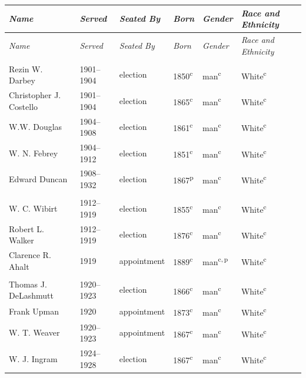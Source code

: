 \begin{longtable}{Q}
\toprule \textit{Name} & \textit{Served} & \textit{Seated By} & \textit{Born} & \textit{Gender} & \textit{Race and Ethnicity} \\ \midrule \endfirsthead
\toprule \textit{Name} & \textit{Served} & \textit{Seated By} & \textit{Born} & \textit{Gender} & \textit{Race and Ethnicity} \\ \midrule \endhead
\bottomrule \endfoot
{} \\*
Rezin W. Darbey & 1901--1904 & election & 1850\textsuperscript{c} & man\textsuperscript{c} & White\textsuperscript{c} \\*
Christopher J. Costello & 1901--1904 & election & 1865\textsuperscript{c} & man\textsuperscript{c} & White\textsuperscript{c} \\
W.W. Douglas & 1904--1908 & election & 1861\textsuperscript{c} & man\textsuperscript{c} & White\textsuperscript{c} \\
W. N. Febrey & 1904--1912 & election & 1851\textsuperscript{c} & man\textsuperscript{c} & White\textsuperscript{c} \\*
Edward Duncan & 1908--1932 & election & 1867\textsuperscript{p} & man\textsuperscript{c} & White\textsuperscript{c} \\
\addlinespace[1.4ex]
 \\*
W. C. Wibirt & 1912--1919 & election & 1855\textsuperscript{c} & man\textsuperscript{c} & White\textsuperscript{c} \\*
Robert L. Walker & 1912--1919 & election & 1876\textsuperscript{c} & man\textsuperscript{c} & White\textsuperscript{c} \\*
Clarence R. Ahalt & 1919 & appointment & 1889\textsuperscript{c} & man\textsuperscript{c,\,p} & White\textsuperscript{c} \\
\addlinespace[1.4ex]
 \\*
Thomas J. DeLashmutt & 1920--1923 & election & 1866\textsuperscript{c} & man\textsuperscript{c} & White\textsuperscript{c} \\*
Frank Upman & 1920 & appointment & 1873\textsuperscript{c} & man\textsuperscript{c} & White\textsuperscript{c} \\
W. T. Weaver & 1920--1923 & appointment & 1867\textsuperscript{c} & man\textsuperscript{c} & White\textsuperscript{c} \\
W. J. Ingram & 1924--1928 & election & 1867\textsuperscript{c} & man\textsuperscript{c} & White\textsuperscript{c} \\

\end{longtable}
